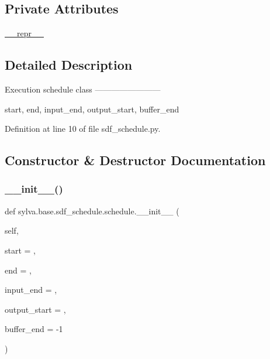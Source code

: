 \subsection*{Private Attributes}
\begin{DoxyCompactItemize}
\item 
\hyperlink{classsylva_1_1base_1_1sdf__schedule_1_1schedule_af309e46fd39384bbe87dc0f0a5e04b5a}{\+\_\+\+\_\+repr\+\_\+\+\_\+}
\end{DoxyCompactItemize}


\subsection{Detailed Description}
\begin{DoxyVerb}  Execution schedule class
  ------------------------

  start, end, input_end, output_start, buffer_end
\end{DoxyVerb}
 

Definition at line 10 of file sdf\+\_\+schedule.\+py.



\subsection{Constructor \& Destructor Documentation}
\mbox{\label{classsylva_1_1base_1_1sdf__schedule_1_1schedule_a5af35d66cbfe25e361e92cb9a22cfd3d}} 
\subsubsection{\texorpdfstring{\+\_\+\+\_\+init\+\_\+\+\_\+()}{\_\_init\_\_()}}
{\footnotesize\ttfamily def sylva.\+base.\+sdf\+\_\+schedule.\+schedule.\+\_\+\+\_\+init\+\_\+\+\_\+ (\begin{DoxyParamCaption}\item[{}]{self,  }\item[{}]{start = {},  }\item[{}]{end = {},  }\item[{}]{input\+\_\+end = {},  }\item[{}]{output\+\_\+start = {},  }\item[{}]{buffer\+\_\+end = {\ttfamily -\/1} }\end{DoxyParamCaption})}



